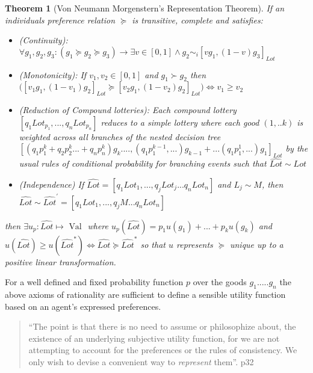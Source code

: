 \documentclass[
]{book}
\newtheorem{theorem}{Theorem}[chapter]
\theoremstyle{definition}
\theoremstyle{definition}
\theoremstyle{definition}
\theoremstyle{remark}
\begin{document}
\begin{theorem}[Von Neumann Morgenstern's Representation Theorem]
\protect\hypertarget{thm:unnamed-chunk-14}{}{\label{thm:unnamed-chunk-14} \iffalse (Von Neumann Morgenstern's Representation Theorem) \fi{} }If an individuals preference relation \(\succeq\) is transitive, complete and satisfies:

\begin{itemize}
\item
  (Continuity): \(\forall g_{1} , g_{2} , g_{3} : ( g_{1} \succeq g_{2} \succeq g_{3}) \rightarrow \exists v \in [0, 1] \wedge g_{2} \sim_{i} [v g_{1}, (1-v) g_{3}]_{Lot}\)
\item
  (Monotonicity): If \(v_{1}, v_{2} \in [0, 1]\) and \(g_{1} \succ g_{2}\) then \(\Big( [ v_{1} g_{1}, (1-v_{1})g_{2}]_{Lot} \succeq [ v_{2} g_{1}, (1-v_{2})g_{2}]_{Lot} \Big) \Leftrightarrow v_{1} \geq v_{2}\)
\item
  (Reduction of Compound lotteries): Each compound lottery \({[q_{1}Lot_{p_{1}}, ..., q_{n}Lot_{p_{n}}]}\) reduces to a simple lottery where each good \((1, .. k)\) is weighted across all branches of the nested decision tree \({[(q_{1}p^{k}_{1} + q_{2}p^{k}_{2} ... + q_{n}p^{k}_{n})g_{k} .... , (q_{1}p^{k-1}_{1} , ...)g_{k-1} + ... (q_{1}p^{1}_{1} , ...)g_{1}]_{Lot}}\) by the usual rules of conditional probability for branching events such that \(\widehat{Lot} \sim Lot\)
\item
  (Independence) If \(\widehat{Lot} = [q_{1}Lot_{1}, ..., q_{j}Lot_{j}...q_{n}Lot_{n}]\) and \(L_{j} \sim M\), then \(\widehat{Lot} \sim \widehat{Lot}^{'} = [q_{1}Lot_{1}, ..., q_{j}M...q_{n}Lot_{n}]\)
\end{itemize}

then \(\exists u_{p} :\widehat{Lot} \mapsto \text{ Val }\) where
\(u_{p}(\widehat{Lot}) = p_{1}u(g_{1}) + ... + p_{k}u(g_{k})\) and \(u(\widehat{Lot}) \geq u(\widehat{Lot}^{*}) \Leftrightarrow \widehat{Lot} \succeq \widehat{Lot}^{*}\) so that \(u\) represents \(\succeq\) unique up to a positive linear transformation.
\end{theorem}

For a well defined and fixed probability function \(p\) over the goods \(g_{1} ..... g_{n}\) the above axioms of rationality are sufficient to define a sensible utility function based on an agent's expressed preferences.

\begin{quote}
``The point is that there is no need to assume or philosophize about, the existence of an underlying subjective utility function, for we are not attempting to account for the preferences or the rules of consistency. We only wish to devise a convenient way to \emph{represent} them''. p32 \citep{luce1989games}
\end{quote}
\end{document}
